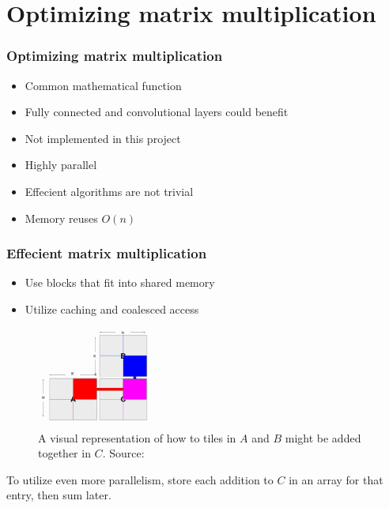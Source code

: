 \documentclass{beamer}
\begin{document}
\section{Optimizing matrix multiplication}

\begin{frame}
    \frametitle{Optimizing matrix multiplication}
    
    \begin{itemize}
        \item Common mathematical function
        \item Fully connected and convolutional layers could benefit
        \item Not implemented in this project
        \item Highly parallel
        \item Effecient algorithms are not trivial
        \item Memory reuses $O(n)$
    \end{itemize}
\end{frame}

\begin{frame}
    \frametitle{Effecient matrix multiplication}
    
    \begin{itemize}
        \item Use blocks that fit into shared memory
        \item Utilize caching and coalesced access
    \end{itemize}

    \begin{figure}
        \centering
        \includegraphics[width=0.35\textwidth]{../assets/gemm.png}
        \caption{A visual representation of how to tiles in $A$ and $B$ might be added together in $C$. Source: \cite{gemm}}
        \label{fig:gemm}
    \end{figure}

    To utilize even more parallelism, store each addition to $C$ in an array for that entry, then sum later.
\end{frame}
\end{document}
